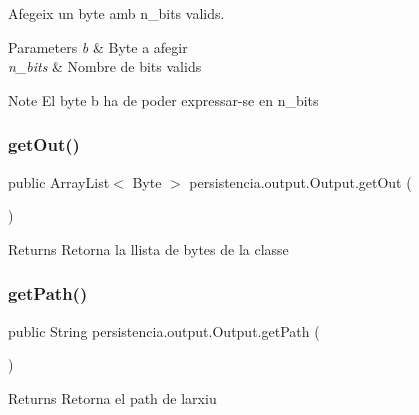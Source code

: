 Afegeix un byte amb n\+\_\+bits valids. 


\begin{DoxyParams}{Parameters}
{\em b} & Byte a afegir \\
\hline
{\em n\+\_\+bits} & Nombre de bits valids \\
\hline
\end{DoxyParams}
\begin{DoxyNote}{Note}
El byte b ha de poder expressar-\/se en n\+\_\+bits 
\end{DoxyNote}
\mbox{\label{classpersistencia_1_1output_1_1Output_ae4f870c86bed5b445125df989b313b9f}} 
\subsubsection{\texorpdfstring{get\+Out()}{getOut()}}
{\footnotesize\ttfamily public Array\+List$<$ Byte $>$ persistencia.\+output.\+Output.\+get\+Out (\begin{DoxyParamCaption}{ }\end{DoxyParamCaption})\hspace{0.3cm}{\ttfamily [inline]}}

\begin{DoxyReturn}{Returns}
Retorna la llista de bytes de la classe 
\end{DoxyReturn}
\mbox{\label{classpersistencia_1_1output_1_1Output_ae33fc52334f791b6d4d7aebf2931df8d}} 
\subsubsection{\texorpdfstring{get\+Path()}{getPath()}}
{\footnotesize\ttfamily public String persistencia.\+output.\+Output.\+get\+Path (\begin{DoxyParamCaption}{ }\end{DoxyParamCaption})\hspace{0.3cm}{\ttfamily [inline]}}

\begin{DoxyReturn}{Returns}
Retorna el path de l\textquotesingle{}arxiu 
\end{DoxyReturn}
\mbox{\label{classpersistencia_1_1output_1_1Output_a01f862217e01efb59bc2eff3fe54006f}} 
